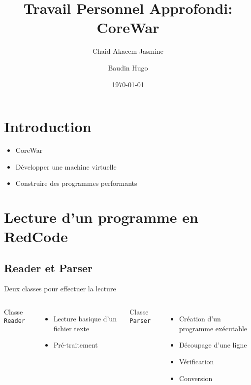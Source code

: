 \documentclass{beamer}
\title[CoreWar]{Travail Personnel Approfondi: CoreWar}
\author[]{Chaid Akacem Jasmine \and Baudin Hugo}
\institute{Université de Caen}
\date{\today}
\begin{document}
 
\maketitle 

\section*{Introduction} %

\begin{frame}
\begin{itemize}
    \item CoreWar
    \item Développer une machine virtuelle
    \item Construire des programmes performants
\end{itemize}
\end{frame}

\tableofcontents %

\section{Lecture d'un programme en RedCode}
\subsection{Reader et Parser}
\begin{frame} %
\begin{center}
{\Large Deux classes pour effectuer la lecture}
\end{center}
\begin{columns}
Classe \texttt{Reader}
\begin{itemize}
    \item Lecture basique d'un fichier texte
    \item Pré-traitement
\end{itemize}
Classe \texttt{Parser}
\begin{itemize}
    \item Création d'un programme exécutable
    \item Découpage d'une ligne
    \item Vérification
    \item Conversion
\end{itemize}
\end{columns}
\end{frame}
\end{document}
